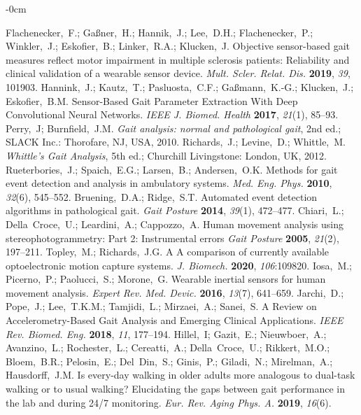 \documentclass[sensors,article,submit,pdftex,moreauthors]{Definitions/mdpi}
\begin{document}
\begin{adjustwidth}{-\extralength}{0cm}
\begin{thebibliography}{999}
	Flachenecker,~F.; Ga{\ss}ner,~H.; Hannik,~J.; Lee,~D.H.; Flachenecker,~P.; Winkler,~J.; Eskofier,~B.; Linker,~R.A.; Klucken,~J. Objective sensor-based gait measures reflect motor impairment in multiple sclerosis patients: Reliability and clinical validation of a wearable sensor device. {\em Mult. Scler. Relat. Dis.} {\bf 2019}, {\em 39}, 101903.
	Hannink,~J.; Kautz,~T.; Pasluosta,~C.F.; Ga{\ss}mann,~K.-G.; Klucken,~J.; Eskofier,~B.M. Sensor-Based Gait Parameter Extraction With Deep Convolutional Neural Networks. {\em IEEE J. Biomed. Health} {\bf 2017}, {\em 21}(1), 85--93.
	Perry,~J; Burnfield,~J.M. \textit{Gait analysis: normal and pathological gait}, 2nd ed.; SLACK Inc.: Thorofare, NJ, USA, 2010.
	Richards,~J.; Levine,~D.; Whittle,~M. \textit{Whittle's Gait Analysis}, 5th ed.; Churchill Livingstone: London, UK, 2012.
	Rueterbories,~J.; Spaich,~E.G.; Larsen,~B.; Andersen,~O.K. Methods for gait event detection and analysis in ambulatory systems. {\em Med. Eng. Phys.} {\bf 2010}, {\em 32}(6), 545--552.
	Bruening,~D.A.; Ridge,~S.T. Automated event detection algorithms in pathological gait. {\em Gait Posture} {\bf 2014}, {\em 39}(1), 472--477.
	Chiari,~L.; Della~Croce,~U.; Leardini,~A.; Cappozzo,~A. Human movement analysis using stereophotogrammetry: Part 2: Instrumental errors {\em Gait Posture} {\bf 2005}, {\em 21}(2), 197--211.
	Topley,~M.; Richards,~J.G. A A comparison of currently available optoelectronic motion capture systems. {\em J. Biomech.} {\bf 2020}, {\em 106}:109820.	
	Iosa,~M.; Picerno,~P.; Paolucci,~S.; Morone,~G. Wearable inertial sensors for human movement analysis. {\em Expert Rev. Med. Devic.} {\bf 2016}, {\em 13}(7), 641--659.
	Jarchi,~D.; Pope,~J.; Lee,~T.K.M.; Tamjidi,~L.; Mirzaei,~A.; Sanei,~S. A Review on Accelerometry-Based Gait Analysis and Emerging Clinical Applications. {\em IEEE Rev. Biomed. Eng.} {\bf 2018}, {\em 11}, 177--194.
	Hillel,~I; Gazit,~E.; Nieuwboer,~A.; Avanzino,~L.; Rochester,~L.; Cereatti,~A.; Della~Croce,~U.; Rikkert,~M.O.; Bloem,~B.R.; Pelosin,~E.; Del~Din,~S.; Ginis,~P.; Giladi,~N.;  Mirelman,~A.; Hausdorff,~J.M. Is every-day walking in older adults more analogous to dual-task walking or to usual walking? Elucidating the gaps between gait performance in the lab and during 24/7 monitoring. {\em Eur. Rev. Aging Phys. A.} {\bf 2019}, {\em 16}(6).

\end{thebibliography}
\end{adjustwidth}
\end{document}
